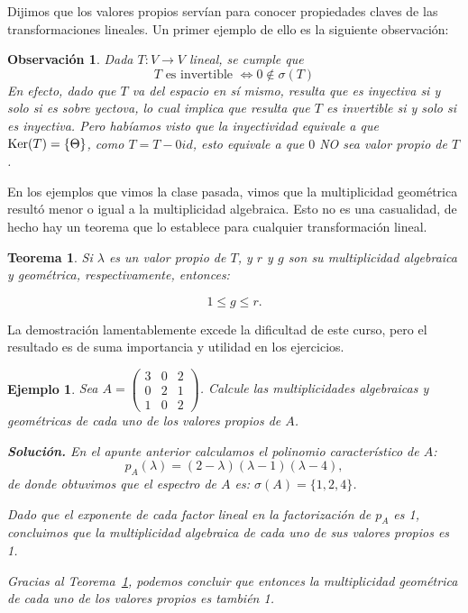 \documentclass[12pt]{book}
\newtheorem{teo}{Teorema}
\newtheorem{obs}{Observaci\'on}
\newtheorem{ejem}{Ejemplo}
\def\Ker{\textup{Ker}}
\begin{document}
Dijimos que los valores propios servían para conocer propiedades claves de las transformaciones lineales. 
Un primer ejemplo de ello es la siguiente observación:

\begin{obs}\label{teo:invertible}
Dada $T:V\rightarrow V$ lineal, se cumple que
$$ T\textrm{  es invertible }\Leftrightarrow 0\not\in\sigma(T) $$
En efecto, dado que $T$ va del espacio en sí mismo, resulta que es inyectiva si y solo si es sobre yectova, lo cual implica que resulta que $T$ es invertible si y solo si es inyectiva.
Pero habíamos visto que la inyectividad equivale a que $\Ker(T)=\{\Theta\}$, como $T=T-0 id$, esto equivale a que $0$ NO sea valor propio de $T$.
\end{obs}



En los ejemplos que vimos la clase pasada, vimos que la multiplicidad geométrica resultó menor o igual a la multiplicidad algebraica. 
Esto no es una casualidad, de hecho hay un teorema que lo establece para cualquier transformación lineal.

\begin{teo}\label{teo:1gr}
Si $\lambda$ es un valor propio de $T$, y $r$ y $g$ son su multiplicidad algebraica y geométrica, respectivamente, entonces:

$$1\le g\le r.$$
\end{teo}

La demostración lamentablemente excede la dificultad de este curso, pero el resultado es de suma importancia y utilidad en los ejercicios.

\begin{ejem}
Sea $A=\left(\begin{array}{ccc} 3 & 0 & 2 \\ 0 & 2 & 1 \\ 1 & 0 &2  \end{array}\right)$.
Calcule las multiplicidades algebraicas y geométricas de cada uno de los valores propios de $A$.

{\em 
\textbf{Soluci\'on.}
En el apunte anterior calculamos el polinomio característico de $A$:
$$p_A(\lambda)=(2-\lambda)(\lambda-1)(\lambda-4),$$
de donde obtuvimos que el espectro de $A$ es:
$\sigma(A)=\{1,2,4\}$.

Dado que el exponente de cada factor lineal en la factorización de $p_A$ es 1, concluimos que la multiplicidad algebraica de cada uno de sus valores propios es 1.

Gracias al Teorema~\ref{teo:1gr}, podemos concluir que entonces la multiplicidad geométrica de cada uno de los valores propios es también 1.
}
\end{ejem}
\end{document}
